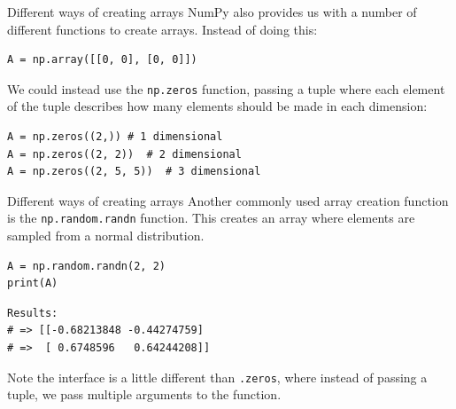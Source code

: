 \documentclass[10pt]{beamer}
\begin{document}
\begin{frame}[label={sec:org5e5f39f},fragile]{Different ways of creating arrays}
 NumPy also provides us with a number of different functions to create arrays. Instead
of doing this:

\begin{verbatim}
A = np.array([[0, 0], [0, 0]])
\end{verbatim}

We could instead use the \texttt{np.zeros} function, passing a tuple where each element of
the tuple describes how many elements should be made in each dimension:

\begin{verbatim}
A = np.zeros((2,)) # 1 dimensional
A = np.zeros((2, 2))  # 2 dimensional
A = np.zeros((2, 5, 5))  # 3 dimensional
\end{verbatim}
\end{frame}

\begin{frame}[label={sec:org8c194f1},fragile]{Different ways of creating arrays}
 Another commonly used array creation function is the \texttt{np.random.randn} function. This
creates an array where elements are sampled from a normal distribution.

\begin{verbatim}
A = np.random.randn(2, 2)
print(A)
\end{verbatim}

\begin{verbatim}
Results: 
# => [[-0.68213848 -0.44274759]
# =>  [ 0.6748596   0.64244208]]
\end{verbatim}


\alert{Note} the interface is a little different than \texttt{.zeros}, where instead of passing a
tuple, we pass multiple arguments to the function.
\end{frame}
\end{document}
